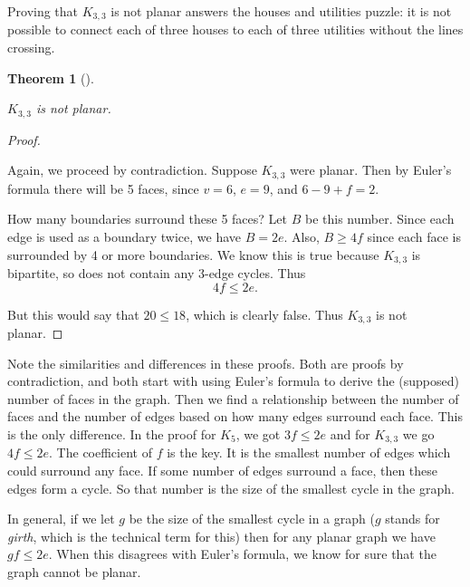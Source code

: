 \documentclass[10pt,]{book}
\theoremstyle{plain}
\newtheorem{theorem}{Theorem}[section]
\theoremstyle{definition}
\theoremstyle{definition}
\theoremstyle{definition}
\numberwithin{equation}{chapter}
\begin{document}
Proving that \(K_{3,3}\) is not planar answers the houses and utilities puzzle: it is not possible to connect each of three houses to each of three utilities without the lines crossing.
%
\begin{theorem}[]\label{theorem-3}

\(K_{3,3}\) is not planar.
%
\end{theorem}
\begin{proof}\hypertarget{proof-56}{}

Again, we proceed by contradiction. Suppose \(K_{3,3}\) were planar. Then by Euler's formula there will be 5 faces, since \(v = 6\), \(e = 9\), and \(6 - 9 + f = 2\).
%
\par

How many boundaries surround these 5 faces? Let \(B\) be this number. Since each edge is used as a boundary twice, we have \(B = 2e\). Also, \(B \ge 4f\) since each face is surrounded by 4 or more boundaries. We know this is true because \(K_{3,3}\) is bipartite, so does not contain any 3-edge cycles. Thus
\begin{equation*}
  4f \le 2e.
\end{equation*}
%
\par

But this would say that \(20 \le 18\), which is clearly false. Thus \(K_{3,3}\) is not planar.
%
\end{proof}
\par

Note the similarities and differences in these proofs. Both are proofs by contradiction, and both start with using Euler's formula to derive the (supposed) number of faces in the graph. Then we find a relationship between the number of faces and the number of edges based on how many edges surround each face. This is the only difference. In the proof for \(K_5\), we got \(3f \le 2e\) and for \(K_{3,3}\) we go \(4f \le 2e\). The coefficient of \(f\) is the key. It is the smallest number of edges which could surround any face. If some number of edges surround a face, then these edges form a cycle. So that number is the size of the smallest cycle in the graph.
%
\par

In general, if we let \(g\) be the size of the smallest cycle in a graph (\(g\) stands for \emph{girth}, which is the technical term for this) then for any planar graph we have \(gf \le 2e\). When this disagrees with Euler's formula, we know for sure that the graph cannot be planar.
%
\typeout{************************************************}
\typeout{************************************************}
\end{document}
